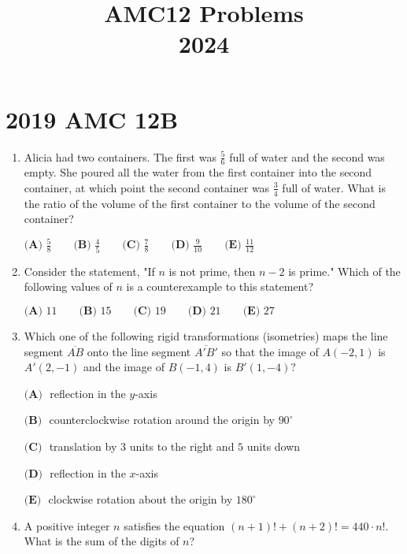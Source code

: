 \documentclass{article}
\title{AMC12 Problems \\ 2024}
\date{}
\begin{document}
\maketitle\thispagestyle{fancy}\newpage\section*{2019 AMC 12B}\begin{enumerate}[label=\arabic*., itemsep=0.5em]\item Alicia had two containers. The first was \(\tfrac{5}{6}\) full of water and the second was empty. She poured all the water from the first container into the second container, at which point the second container was \(\tfrac{3}{4}\) full of water. What is the ratio of the volume of the first container to the volume of the second container?

\(\textbf{(A) } \frac{5}{8} \qquad \textbf{(B) } \frac{4}{5} \qquad \textbf{(C) } \frac{7}{8} \qquad \textbf{(D) } \frac{9}{10} \qquad \textbf{(E) } \frac{11}{12}\)\par \vspace{0.5em}\item Consider the statement, "If \(n\) is not prime, then \(n-2\) is prime." Which of the following values of \(n\) is a counterexample to this statement?

\(\textbf{(A) } 11 \qquad \textbf{(B) } 15 \qquad \textbf{(C) } 19 \qquad \textbf{(D) } 21 \qquad \textbf{(E) } 27\)\par \vspace{0.5em}\item Which one of the following rigid transformations (isometries) maps the line segment \(\overline{AB}\) onto the line segment \(\overline{A'B'}\) so that the image of \(A(-2,1)\) is \(A'(2,-1)\) and the image of \(B(-1,4)\) is \(B'(1,-4)?\)

\(\textbf{(A) } \) reflection in the \(y\)-axis

\(\textbf{(B) } \) counterclockwise rotation around the origin by \(90^{\circ}\)

\(\textbf{(C) } \) translation by \(3\) units to the right and \(5\) units down

\(\textbf{(D) } \) reflection in the \(x\)-axis

\(\textbf{(E) } \) clockwise rotation about the origin by \(180^{\circ}\)\par \vspace{0.5em}\item A positive integer \(n\) satisfies the equation \((n+1)!+(n+2)!=440\cdot n!\). What is the sum of the digits of \(n\)?


\end{enumerate}
\end{document}
